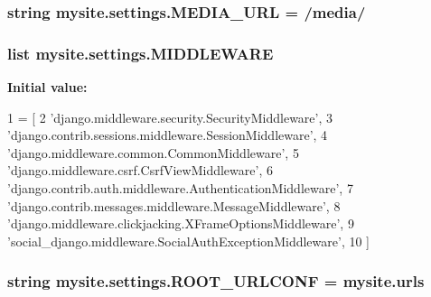 \subsubsection[{\texorpdfstring{M\+E\+D\+I\+A\+\_\+\+U\+RL}{MEDIA_URL}}]{\setlength{\rightskip}{0pt plus 5cm}string mysite.\+settings.\+M\+E\+D\+I\+A\+\_\+\+U\+RL = \textquotesingle{}/media/\textquotesingle{}}\hypertarget{namespacemysite_1_1settings_a2e12145dd0b032b6b22563f5edf9f920}{}\label{namespacemysite_1_1settings_a2e12145dd0b032b6b22563f5edf9f920}
\subsubsection[{\texorpdfstring{M\+I\+D\+D\+L\+E\+W\+A\+RE}{MIDDLEWARE}}]{\setlength{\rightskip}{0pt plus 5cm}list mysite.\+settings.\+M\+I\+D\+D\+L\+E\+W\+A\+RE}\hypertarget{namespacemysite_1_1settings_a90df4fc7c17f07da22241f9ceb21f3b9}{}\label{namespacemysite_1_1settings_a90df4fc7c17f07da22241f9ceb21f3b9}
{\bfseries Initial value\+:}
\begin{DoxyCode}
1 = [
2     \textcolor{stringliteral}{'django.middleware.security.SecurityMiddleware'},
3     \textcolor{stringliteral}{'django.contrib.sessions.middleware.SessionMiddleware'},
4     \textcolor{stringliteral}{'django.middleware.common.CommonMiddleware'},
5     \textcolor{stringliteral}{'django.middleware.csrf.CsrfViewMiddleware'},
6     \textcolor{stringliteral}{'django.contrib.auth.middleware.AuthenticationMiddleware'},
7     \textcolor{stringliteral}{'django.contrib.messages.middleware.MessageMiddleware'},
8     \textcolor{stringliteral}{'django.middleware.clickjacking.XFrameOptionsMiddleware'},
9     \textcolor{stringliteral}{'social\_django.middleware.SocialAuthExceptionMiddleware'},
10 ]
\end{DoxyCode}
\subsubsection[{\texorpdfstring{R\+O\+O\+T\+\_\+\+U\+R\+L\+C\+O\+NF}{ROOT_URLCONF}}]{\setlength{\rightskip}{0pt plus 5cm}string mysite.\+settings.\+R\+O\+O\+T\+\_\+\+U\+R\+L\+C\+O\+NF = \textquotesingle{}mysite.\+urls\textquotesingle{}}\hypertarget{namespacemysite_1_1settings_ab0a7fa8cdaaccbf5bf874db67cbe507a}{}\label{namespacemysite_1_1settings_ab0a7fa8cdaaccbf5bf874db67cbe507a}
